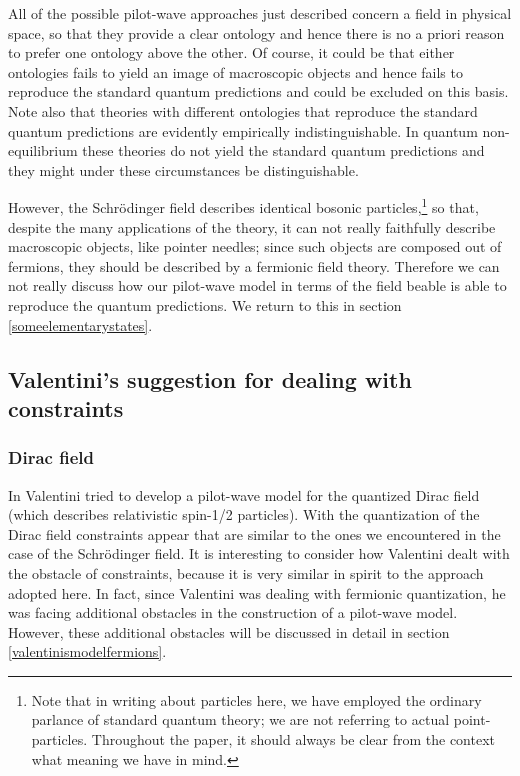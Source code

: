 \documentclass[12pt]{article}
\begin{document}
All of the possible pilot-wave approaches just described concern a field in physical space, so that they provide a clear ontology and hence there is no a priori reason to prefer one ontology above the other. Of course, it could be that either ontologies fails to yield an image of macroscopic objects and hence fails to reproduce the standard quantum predictions and could be excluded on this basis. Note also that theories with different ontologies that reproduce the standard quantum predictions are evidently empirically indistinguishable. In quantum non-equilibrium these theories do not yield the standard quantum predictions and they might under these circumstances be distinguishable. 

However, the Schr{\"o}\-ding\-er field describes identical bosonic particles,{\footnote{Note that in writing about particles here, we have employed the ordinary parlance of standard quantum theory; we are not referring to actual point-particles. Throughout the paper, it should always be clear from the context what meaning we have in mind.}} so that, despite the many applications of the theory, it can not really faithfully describe macroscopic objects, like pointer needles; since such objects are composed out of fermions, they should be described by a fermionic field theory. Therefore we can not really discuss how our pilot-wave model in terms of the field beable is able to reproduce the quantum predictions. We return to this in section \ref{someelementarystates}.


\subsection{Valentini's suggestion for dealing with constraints}\label{valentinisway}
\subsubsection{Dirac field}\label{valentiniswaydiracfield}
In \cite{valentini92,valentini96} Valentini tried to develop a pilot-wave model for the quantized Dirac field (which describes relativistic spin-1/2 particles). With the quantization of the Dirac field constraints appear that are similar to the ones we encountered in the case of the Schr{\"o}\-ding\-er field. It is interesting to consider how Valentini dealt with the obstacle of constraints, because it is very similar in spirit to the approach adopted here. In fact, since Valentini was dealing with fermionic quantization, he was facing additional obstacles in the construction of a pilot-wave model. However, these additional obstacles will be discussed in detail in section \ref{valentinismodelfermions}. 
\end{document}
